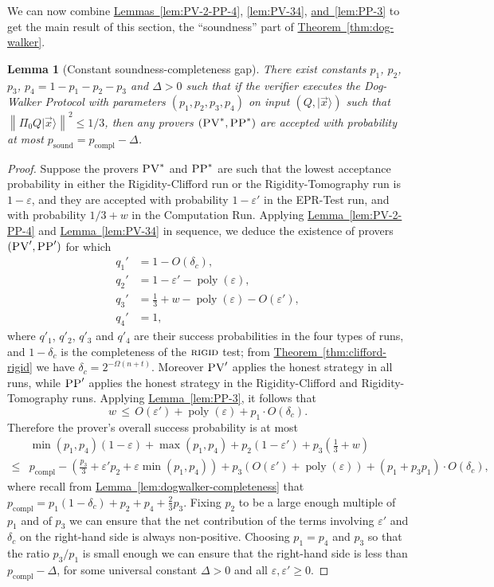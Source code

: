 \documentclass[11pt]{article}
\numberwithin{equation}{section}
\newtheorem{lemma}[theorem]{Lemma}
\theoremstyle{definition}
\theoremstyle{plain}
\newcommand{\expref}[2]{\hyperref[#2]{#1~\ref{#2}}}
\newcommand{\ket}[1]{|#1\rangle}
\DeclareMathOperator{\poly}{poly}
\DeclareMathOperator{\sound}{sound}
\DeclareMathOperator{\compl}{compl}
\newcommand{\norm}[1]{\left\|#1\right\|}
\newcommand{\eps}{\varepsilon}
\newcommand{\rigid}{\textsc{rigid}}
\newcommand{\pv}{\textsc{PV}}
\newcommand{\pp}{\textsc{PP}}
\begin{document}
We can now combine \expref{Lemmas}{lem:PV-2-PP-4}, \ref{lem:PV-34}, \expref{and}{lem:PP-3} to get the main result of this section, the ``soundness'' part of \expref{Theorem}{thm:dog-walker}.

\begin{lemma}[Constant soundness-completeness gap]\label{lem:dogwalker-soundness}
 There exist constants $p_1$, $p_2$, $p_3$, $p_4=1-p_1-p_2-p_3$ and $\Delta>0$ such that if the verifier executes the Dog-Walker Protocol with parameters $(p_1,p_2,p_3,p_4)$ on input $(Q,\ket{\vec{x}})$ such that $\norm{\Pi_0 Q\ket{\vec{x}}}^2\leq 1/3$, then any provers $(\pv^*,\pp^*)$ are accepted with probability at most $p_{\sound}=p_{\compl}-\Delta$. 
\end{lemma}

\begin{proof}
Suppose the provers $\pv^*$ and $\pp^*$ are such that the lowest acceptance probability in either the Rigidity-Clifford run or the Rigidity-Tomography run is $1- \eps$, and they are accepted with probability $1-\eps'$ in the EPR-Test run, and with probability $1/3+w$ in the Computation Run. Applying  \expref{Lemma}{lem:PV-2-PP-4} and \expref{Lemma}{lem:PV-34} in sequence, we deduce the existence of provers $(\pv',\pp')$ for which
\begin{align*}
q_1' &= 1- O(\delta_c), \\  q_2' &= 1-\eps'- \poly(\eps), \\ q_3' &= \frac13+w-
  \poly(\eps)-O(\eps'),\\ q_4' &= 1,
\end{align*}
where $q'_1$, $q'_2$, $q'_3$ and $q'_4$ are their success probabilities in the
  four types of runs, and $1-\delta_c$ is the completeness of the
  $\rigid$ test; from \expref{Theorem}{thm:clifford-rigid} we have $\delta_c = 2^{-\Omega(n+t)}$. Moreover $\pv'$ applies the honest strategy in all runs, while $\pp'$ applies the honest strategy in the Rigidity-Clifford and Rigidity-Tomography runs. Applying \expref{Lemma}{lem:PP-3}, it follows that 
$$w \,\leq\, O(\eps') + \poly(\eps) +p_1 \cdot O(\delta_c).$$
Therefore the prover's overall success probability is at most 
\begin{align*}
& \min(p_1,p_4)(1-\eps)+\max(p_1,p_4) + p_2(1-\eps')+p_3\left(\frac{1}{3}+w\right) \\
\leq & p_{\compl} - \left( \frac{p_3}{3} + \eps' p_2+\eps\min(p_1,p_4)\right)+ p_3\left(O(\eps')+\poly(\eps)\right)+ (p_1 + p_3p_1) \cdot O(\delta_c),
\end{align*}
where recall from \expref{Lemma}{lem:dogwalker-completeness} that
  $p_{\compl} =  p_1(1-\delta_c)+p_2+p_4+\frac{2}{3}p_3$. Fixing $p_2$
  to be a large enough multiple of $p_1$ and of $p_3$ we can ensure that the net contribution
  of the terms involving $\eps'$ and $\delta_c$ on the right-hand side is always
  non-positive. Choosing $p_1=p_4$ and $p_3$ so that the ratio $p_3/p_1$ is small
  enough we can ensure that the right-hand side is less than $p_{\compl}
  -\Delta$, for some universal constant $\Delta>0$ and all $\eps,\eps'\geq 0$.
\end{proof}
\end{document}
